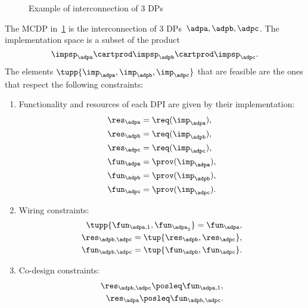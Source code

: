 \begin{figure}
    \centering
    \caption{Example of interconnection of 3 DPs}
    \label{fig:exampleq}
\end{figure}
\begin{example}
    The MCDP in~\cref{fig:exampleq} is the interconnection of 3
    DPs~$\adpa,\adpb,\adpc$.
    The implementation space is a subset of the product
    \begin{equation}
        \impsp_\adpa \cartprod  \impsp_\adpb \cartprod \impsp_\adpc.
    \end{equation}
    The elements $\tupp{\imp_\adpa, \imp_\adpb, \imp_\adpc}$ that are feasible are the ones that respect the following constraints:
    \begin{enumerate}
        \item Functionality and resources of each DPI are given by their implementation:
              \begin{align}
                  \res_\adpa & = \req(\imp_\adpa),  \\
                  \res_\adpb & = \req(\imp_\adpb),  \\
                  \res_\adpc & = \req(\imp_\adpc),  \\
                  \fun_\adpa & = \prov(\imp_\adpa), \\
                  \fun_\adpb & = \prov(\imp_\adpb), \\
                  \fun_\adpc & = \prov(\imp_\adpc).
              \end{align}
        \item Wiring constraints:
              \begin{align}
                  \tupp{\fun_{\adpa,1}, \fun_{\adpa_2}}  = \fun_\adpa, \\
                  \res_{\adpb,\adpc}=\tup{\res_\adpb,\res_\adpc},      \\
                  \fun_{\adpb,\adpc}=\tup{\fun_\adpb,\fun_\adpc}.
              \end{align}
        \item Co-design constraints:
              \begin{align}
                  \res_{\adpb,\adpc}\posleq \fun_{\adpa,1}, \\
                  \res_\adpa \posleq \fun_{\adpb,\adpc}.
              \end{align}
    \end{enumerate}
\end{example}

